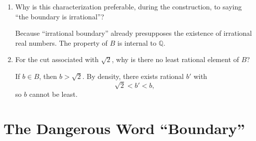 \documentclass{self-check}
\begin{document}
\begin{enumerate}[label=\arabic{*}., itemsep=10pt]
    \begin{answer}
      It is a cut whose upper set \(B\) has no least element.
    \end{answer}
  \item Why is this characterization preferable, during the construction, to saying ``the boundary is irrational''?

    \begin{answer}
      Because ``irrational boundary'' already presupposes the existence of irrational real numbers. The property of \(B\) is internal to \(\mathbb{Q}\).
    \end{answer}
  \item For the cut associated with \(\sqrt{2}\), why is there no least rational element of \(B\)?

    \begin{answer}
      If \(b\in B\), then \(b>\sqrt{2}\). By density, there exists rational \(b'\) with
      \[ \sqrt{2}<b'<b, \]
      so \(b\) cannot be least.
    \end{answer}
\end{enumerate}

\section{The Dangerous Word ``Boundary''}
\end{document}
